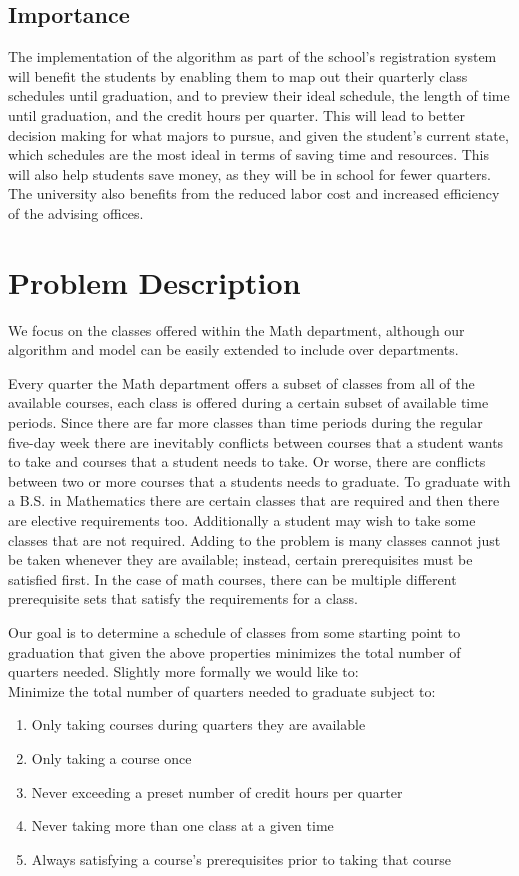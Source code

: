 \documentclass[11pt]{article} %
\begin{document}
\subsection{Importance} The implementation of the algorithm as part of the
school’s registration system will benefit the students by enabling them to map
out their quarterly class schedules until graduation, and to preview their ideal
schedule, the length of time until graduation, and the credit hours per quarter.
This will lead to better decision making for what majors to pursue, and given
the student's current state, which schedules are the most ideal in terms of
saving time and resources. This will also help students save money, as they will
be in school for fewer quarters. The university also benefits from the reduced
labor cost and increased efficiency of the advising offices.


\section{Problem Description} We focus on the classes offered within the Math
department, although our algorithm and model can be easily extended to include
over departments. 

Every quarter the Math department offers a subset of classes from all of the
available courses, each class is offered during a certain subset of available
time periods. Since there are far more classes than time periods during the
regular five-day week there are inevitably conflicts between courses that
a student wants to take and courses that a student needs to take. Or worse,
there are conflicts between two or more courses that a students needs to
graduate. To graduate with a B.S. in Mathematics there are certain classes that
are required and then there are elective requirements too. Additionally
a student may wish to take some classes that are not required.  Adding to the
problem is many classes cannot just be taken whenever they are available;
instead, certain prerequisites must be satisfied first. In the case of math
courses, there can be multiple different prerequisite sets that satisfy the
requirements for a class.

Our goal is to determine a schedule of classes from some starting point to
graduation that given the above properties minimizes the total number of
quarters needed. Slightly more formally we would like to: \\ Minimize the total
number of quarters needed to graduate subject to: \begin{enumerate} \item Only
taking courses during quarters they are available \item Only taking a course
once \item Never exceeding a preset number of credit hours per quarter \item
Never taking more than one class at a given time \item Always satisfying
a course's prerequisites prior to taking that course \end{enumerate}
\end{document}
